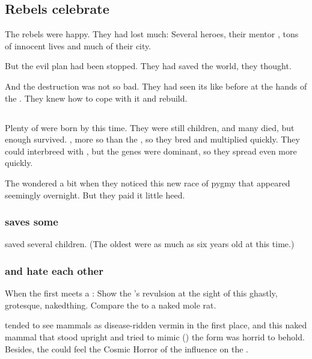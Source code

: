\subsection{Rebels celebrate}
The \nephilic{} rebels were happy.
They had lost much: 
Several heroes, their mentor \Vexstrasshin{}, tons of innocent lives and much of their city. 

But the evil plan had been stopped. 
They had saved the world, they thought. 

And the destruction was not so bad. 
They had seen its like before at the hands of the \dragons. 
They knew how to cope with it and rebuild. 









\subsection{\Humans}
Plenty of \humans{} were born by this time. 
They were still children, and many died, but enough survived. 
, more so than the \nephilim, so they bred and multiplied quickly. 
They could interbreed with \nephilim, but the \human{} genes were dominant, so they spread even more quickly. 

The \dragons{} wondered a bit when they noticed this new race of pygmy \nephilim{} that appeared seemingly overnight. 
But they paid it little heed.





\subsubsection{\Morza saves some \humans}
\Morza saved several \human children. 
(The oldest \humans were as much as six years old at this time.)





\subsubsection{\Scathae and \humans hate each other}
When the first \scatha meets a \human: 
Show the \scatha's revulsion at the sight of this ghastly, grotesque, naked\prikker thing. 
Compare the \human to a naked mole rat. 

\Scathae tended to see mammals as disease-ridden vermin in the first place, and this naked mammal that stood upright and tried to mimic () the \scathaese form was horrid to behold. 
Besides, the \scatha could feel the Cosmic Horror of the \pps{\banes} influence on the \human. 

